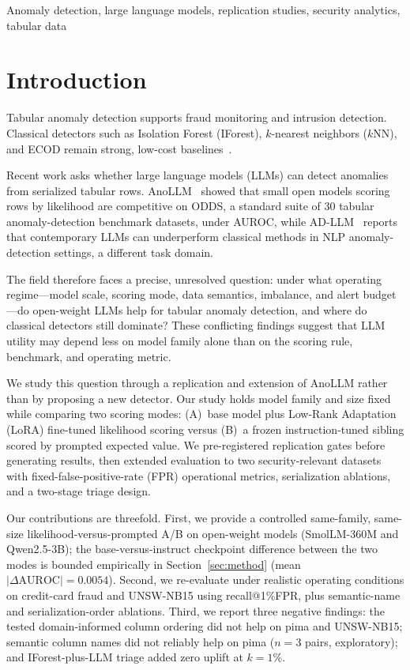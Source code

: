 \documentclass[conference]{IEEEtran}
\begin{document}
\begin{IEEEkeywords}
Anomaly detection, large language models, replication studies, security analytics, tabular data
\end{IEEEkeywords}

\section{Introduction}\label{sec:intro}
Tabular anomaly detection supports fraud monitoring and intrusion detection.
Classical detectors such as Isolation Forest (IForest), $k$-nearest neighbors ($k$NN), and ECOD remain strong, low-cost baselines~\cite{zhao2019pyod,han2022adbench}.

Recent work asks whether large language models (LLMs) can detect anomalies from serialized tabular rows.
AnoLLM~\cite{tsai2025anollm} showed that small open models scoring rows by likelihood are competitive on ODDS, a standard suite of 30 tabular anomaly-detection benchmark datasets, under AUROC, while AD-LLM~\cite{yang2025adllm} reports that contemporary LLMs can underperform classical methods in NLP anomaly-detection settings, a different task domain.

The field therefore faces a precise, unresolved question: under what operating regime---model scale, scoring mode, data semantics, imbalance, and alert budget---do open-weight LLMs help for tabular anomaly detection, and where do classical detectors still dominate?
These conflicting findings suggest that LLM utility may depend less on model family alone than on the scoring rule, benchmark, and operating metric.

We study this question through a replication and extension of AnoLLM rather than by proposing a new detector.
Our study holds model family and size fixed while comparing two scoring modes: (A)~base model plus Low-Rank Adaptation (LoRA) fine-tuned likelihood scoring versus (B)~a frozen instruction-tuned sibling scored by prompted expected value.
We pre-registered replication gates before generating results, then extended evaluation to two security-relevant datasets with fixed-false-positive-rate (FPR) operational metrics, serialization ablations, and a two-stage triage design.

Our contributions are threefold.
First, we provide a controlled same-family, same-size likelihood-versus-prompted A/B on open-weight models (SmolLM-360M and Qwen2.5-3B); the base-versus-instruct checkpoint difference between the two modes is bounded empirically in Section~\ref{sec:method} (mean $|\Delta\mathrm{AUROC}|=0.0054$).
Second, we re-evaluate under realistic operating conditions on credit-card fraud and UNSW-NB15 using recall@1\%FPR, plus semantic-name and serialization-order ablations.
Third, we report three negative findings: the tested domain-informed column ordering did not help on pima and UNSW-NB15; semantic column names did not reliably help on pima ($n=3$ pairs, exploratory); and IForest-plus-LLM triage added zero uplift at $k=1\%$.
\end{document}
